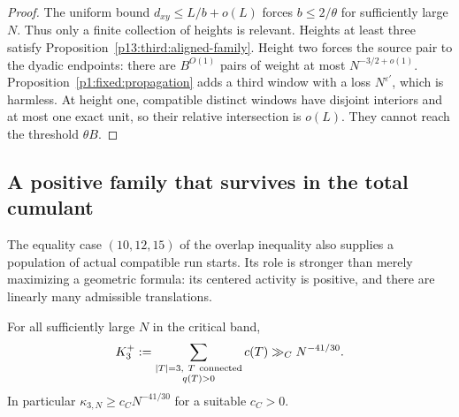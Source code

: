 \begin{proof}
The uniform bound $d_{xy}\leq L/b+o(L)$ forces $b\leq2/\theta$
for sufficiently large $N$.  Thus only a finite collection of heights
is relevant.  Heights at least three satisfy
Proposition~\ref{p13:third:aligned-family}.
Height two forces the source pair to the dyadic endpoints: there are
$B^{O(1)}$ pairs of weight at most $N^{-3/2+o(1)}$.
Proposition~\ref{p1:fixed:propagation} adds a third window with a loss
$N^{\varepsilon'}$, which is harmless.
At height one, compatible distinct windows have disjoint interiors
and at most one exact unit, so their relative intersection is $o(L)$.
They cannot reach the threshold $\theta B$.
\end{proof}

\subsection{A positive family that survives in the total cumulant}

The equality case $(10,12,15)$ of the overlap inequality also supplies
a population of actual compatible run starts.  Its role is stronger
than merely maximizing a geometric formula: its centered activity is
positive, and there are linearly many admissible translations.

\begin{proposition}
\label{p13:third:lower}
For all sufficiently large $N$ in the critical band,
\begin{equation}
 K_3^+:=\sum_{\substack{|T|=3,\ T\ {\rm connected}\\q(T)>0}}c(T)
                  \gg_C N^{-41/30}.
 \label{p13:third:K3-lower}
\end{equation}
In particular $\kappa_{3,N}\geq c_C N^{-41/30}$ for a suitable
$c_C>0$.
\end{proposition}

